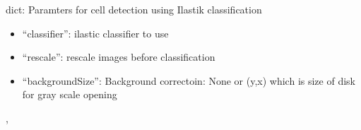 \documentclass[letterpaper,10pt,english]{sphinxmanual}
\begin{document}

\begin{fulllineitems}
\label{api/ClearMap.Parameter:ClearMap.Parameter.IlastikParameter}
dict: Paramters for cell detection using Ilastik classification
\begin{itemize}
\item {} 
``classifier'': ilastic classifier to use

\item {} 
``rescale'': rescale images before classification

\item {} 
``backgroundSize'': Background correctoin: None or (y,x) which is size of disk for gray scale opening

\end{itemize}




, 



\end{fulllineitems}

\end{document}
